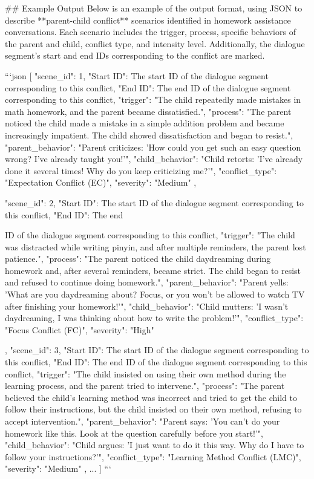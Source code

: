 \begin{spverbatim}
## Example Output
Below is an example of the output format, using JSON to describe **parent-child conflict** scenarios identified in homework assistance conversations. Each scenario includes the trigger, process, specific behaviors of the parent and child, conflict type, and intensity level. Additionally, the dialogue segment's start and end IDs corresponding to the conflict are marked.

```json
[
    {
        "scene_id": 1,
        "Start ID": The start ID of the dialogue segment corresponding to this conflict,
        "End ID": The end ID of the dialogue segment corresponding to this conflict,
        "trigger": "The child repeatedly made mistakes in math homework, and the parent became dissatisfied.",
        "process": "The parent noticed the child made a mistake in a simple addition problem and became increasingly impatient. The child showed dissatisfaction and began to resist.",
        "parent_behavior": "Parent criticizes: 'How could you get such an easy question wrong? I’ve already taught you!'",
        "child_behavior": "Child retorts: 'I’ve already done it several times! Why do you keep criticizing me?'",
        "conflict_type": "Expectation Conflict (EC)",
        "severity": "Medium"
    },
    {
        "scene_id": 2,
        "Start ID": The start ID of the dialogue segment corresponding to this conflict,
        "End ID": The end

 ID of the dialogue segment corresponding to this conflict,
        "trigger": "The child was distracted while writing pinyin, and after multiple reminders, the parent lost patience.",
        "process": "The parent noticed the child daydreaming during homework and, after several reminders, became strict. The child began to resist and refused to continue doing homework.",
        "parent_behavior": "Parent yells: 'What are you daydreaming about? Focus, or you won’t be allowed to watch TV after finishing your homework!'",
        "child_behavior": "Child mutters: 'I wasn’t daydreaming, I was thinking about how to write the problem!'",
        "conflict_type": "Focus Conflict (FC)",
        "severity": "High"
    },
    {
        "scene_id": 3,
        "Start ID": The start ID of the dialogue segment corresponding to this conflict,
        "End ID": The end ID of the dialogue segment corresponding to this conflict,
        "trigger": "The child insisted on using their own method during the learning process, and the parent tried to intervene.",
        "process": "The parent believed the child’s learning method was incorrect and tried to get the child to follow their instructions, but the child insisted on their own method, refusing to accept intervention.",
        "parent_behavior": "Parent says: 'You can’t do your homework like this. Look at the question carefully before you start!'",
        "child_behavior": "Child argues: 'I just want to do it this way. Why do I have to follow your instructions?'",
        "conflict_type": "Learning Method Conflict (LMC)",
        "severity": "Medium"
    },
    ...
]
```


\end{spverbatim}
